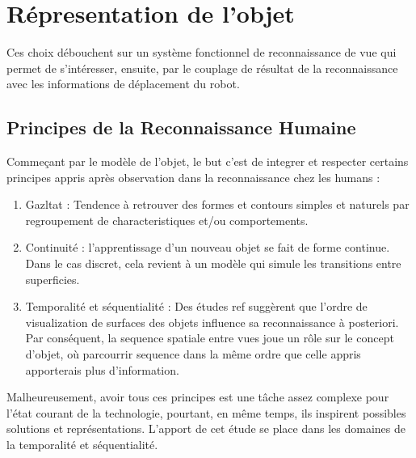 
\section{Répresentation de l'objet}

Ces choix débouchent sur un système fonctionnel de reconnaissance de
vue qui permet de s’intéresser, ensuite, par le couplage de résultat de la
reconnaissance avec les informations de déplacement du robot.

{\color {green}
\subsection {Principes de la Reconnaissance Humaine}

Commeçant par le modèle de l'objet, le but c'est de integrer et
respecter certains principes appris après observation dans la
reconnaissance chez les humans :

\begin{enumerate}
\item Gazltat : Tendence à retrouver des formes et contours simples et
  naturels par regroupement de characteristiques et/ou comportements.

\item Continuité : l'apprentissage d'un nouveau objet se fait de forme
  continue. Dans le cas discret, cela revient à un modèle qui simule les
  transitions entre superficies.

\item Temporalité et séquentialité : Des études {\color{blue} ref} suggèrent que l'ordre
  de visualization de surfaces des objets influence sa reconnaissance à
  posteriori. Par conséquent, la sequence spatiale entre vues joue un rôle sur le concept d'objet, où parcourrir
  sequence dans la même ordre que celle appris apporterais plus d'information.

\end{enumerate}

Malheureusement, avoir tous ces principes est une tâche assez complexe
pour l’état courant de la technologie, pourtant, en même temps, ils inspirent
possibles solutions et représentations. L'apport de cet étude se place dans les
 domaines de la temporalité et séquentialité.

}
